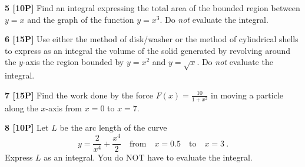 \documentclass[12pt]{article}
\begin{document}

\vspace{4.85in}

{\bf 5 [10P]} Find an integral expressing 
the total area of the bounded region between
${\displaystyle y=x}$ and the graph of the function
${\displaystyle y = x^3 }$. Do \emph{not} evaluate the integral.

\newpage
 

{\bf 6 [15P]} Use either the method of disk/washer or the method of 
cylindrical shells to express as an integral
the volume of the solid generated by revolving around the
$y$-axis the region bounded by $y= x^2$ and
$y=\sqrt{x}$.  Do {\em not} evaluate the integral.

\vspace{4.890in}

{\bf 7 [15P]} Find the work done by the force ${\displaystyle
F(x) = \frac{10}{1+x^2}}$
in moving a particle along the $x$-axis from $x=0$ to $x=7$.

\newpage




{\bf 8 [10P]} Let $L$ be the arc length of the curve 
\begin{equation*} 
y = \frac{2}{x^4} + \frac{x^{4}}{2} 
\quad\textrm{from}\quad
x=0.5 
\quad\textrm{to}\quad
x=3 ~. 
\end{equation*} 
Express $L$ as an integral.  
You do NOT have to evaluate the integral.
\end{document}
